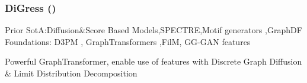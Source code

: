\documentclass[./presentation.tex]{subfiles}
\begin{document}
\begin{frame}[t,label=digress]
  \frametitle{DiGress (\cite{vignacDiGressDiscreteDenoising2023b})}
  \vspace{-1cm}
\footnotesize
\begin{priorart}
{\footnotesize
    Prior SotA:Diffusion\&Score Based Models\citep{niuPermutationInvariantGraph2020b,songGenerativeModelingEstimating2019b},SPECTRE\citep{martinkusSPECTRESpectralConditioning2022b},Motif generators \citep{maziarzLearningExtendMolecular2021},GraphDF\citep{luoGraphDFDiscreteFlow2021d}
\\
Foundations: D3PM \citep{austinStructuredDenoisingDiffusion2021e}, GraphTransformers \citep{vaswaniAttentionAllYou2017c,yunGraphTransformerNetworks2019b},FilM\citep{perezFiLMVisualReasoning2018b}, GG-GAN features \citep{krawczukGGGANGeometricGraph2020}
 }
  \end{priorart}
  \begin{contributions}
    Powerful GraphTransformer, enable use of features with Discrete Graph Diffusion \& Limit Distribution Decomposition 
  \end{contributions}
%
  
\end{frame}
\end{document}

